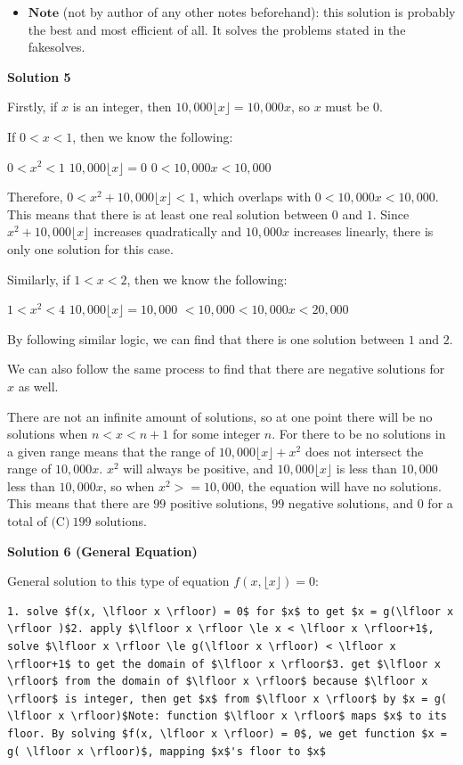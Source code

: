 \begin{enumerate}
 
            \begin{itemize}
        \item $\textbf{Note}$ (not by author of any other notes beforehand): this solution is probably the best and most efficient of all. It solves the problems stated in the fakesolves.
            \end{itemize}
            



\textbf{Solution 5}

Firstly, if $x$ is an integer, then $10,000\lfloor x \rfloor=10,000x$, so $x$ must be $0$.

 If $0<x<1$, then we know the following:

 $0<x^2<1$
$10,000\lfloor x \rfloor =0$
$0<10,000x<10,000$

 Therefore, $0<x^2+10,000\lfloor x \rfloor <1$, which overlaps with $0<10,000x<10,000$. This means that there is at least one real solution between $0$ and $1$. Since $x^2+10,000\lfloor x \rfloor$ increases quadratically and $10,000x$ increases linearly, there is only one solution for this case. 

 Similarly, if $1<x<2$, then we know the following:

 $1<x^2<4$
$10,000\lfloor x \rfloor =10,000$
$<10,000<10,000x<20,000$

 By following similar logic, we can find that there is one solution between $1$ and $2$. 

 We can also follow the same process to find that there are negative solutions for $x$ as well.

 There are not an infinite amount of solutions, so at one point there will be no solutions when $n<x<n+1$ for some integer $n$. For there to be no solutions in a given range means that the range of $10,000\lfloor x \rfloor + x^2$ does not intersect the range of $10,000x$. $x^2$ will always be positive, and $10,000\lfloor x \rfloor$ is less than $10,000$ less than $10,000x$, so when $x^2 >= 10,000$, the equation will have no solutions. This means that there are $99$ positive solutions, $99$ negative solutions, and $0$ for a total of $\boxed{\text{(C)}~199}$ solutions.

 



\textbf{Solution 6 (General Equation)}

General solution to this type of equation $f(x, \lfloor x \rfloor) = 0$:

 \begin{verbatim}
1. solve $f(x, \lfloor x \rfloor) = 0$ for $x$ to get $x = g(\lfloor x \rfloor )$2. apply $\lfloor x \rfloor \le x < \lfloor x \rfloor+1$, solve $\lfloor x \rfloor \le g(\lfloor x \rfloor) < \lfloor x \rfloor+1$ to get the domain of $\lfloor x \rfloor$3. get $\lfloor x \rfloor$ from the domain of $\lfloor x \rfloor$ because $\lfloor x \rfloor$ is integer, then get $x$ from $\lfloor x \rfloor$ by $x = g( \lfloor x \rfloor)$Note: function $\lfloor x \rfloor$ maps $x$ to its floor. By solving $f(x, \lfloor x \rfloor) = 0$, we get function $x = g( \lfloor x \rfloor)$, mapping $x$'s floor to $x$
\end{verbatim}


\end{enumerate}
